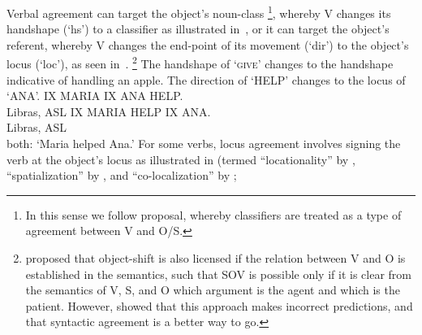 \documentclass[output=paper]{langscibook}
\begin{document}
    \z 
\z
Verbal agreement can target the object's noun-class%
\footnote{%
    In this sense we follow  proposal, whereby
    classifiers are treated as a type of agreement between V and O/S.
}, 
whereby V
changes its handshape (`hs') to a classifier as illustrated in~, or it
can target the object's referent, whereby V changes the end-point of its
movement (`dir') to the object's locus (`loc'), as seen in~.%
\footnote{
    \citet{Fischer.1975} proposed that object-shift is also licensed if the relation
    between V and O is established in the semantics, such that SOV is possible only if it
    is clear from the semantics of V, S, and O which argument is the agent and which is
    the patient. However, \citet{Liddell.1980} showed that this approach makes incorrect
    predictions, and that syntactic agreement is a better way to go.
}
\ea 
    \label{lasz:ex:3}
    The handshape of `\textsc{give}' changes to the \laszClaw{} handshape indicative of handling an apple. 
    \z 
\ex
    \label{lasz:ex:4}
    The direction of `HELP' changes to the locus of `ANA'. 
    \ea 
        IX MARIA IX ANA HELP. \\
        \citep[from][6]{Quadros.etal.2004}
        \hfill 
        \cmark Libras, \cmark ASL 
    \ex 
        IX MARIA HELP IX ANA. \\
        \citep[from][5]{Quadros.etal.2004} 
        \hfill 
        \cmark Libras, \cmark ASL \\
        both: `Maria helped Ana.'
    \z 
\z 
For some verbs, locus agreement involves signing the verb at the
object's locus as illustrated in  (termed ``locationality'' by \citealp{Fischer.Gough.1978}, 
``spatialization'' by \citealp{Quadros.etal.2004}, 
and ``co-localization'' by \citealp{Lourenco.Wilbur.2018}; 
\end{document}
